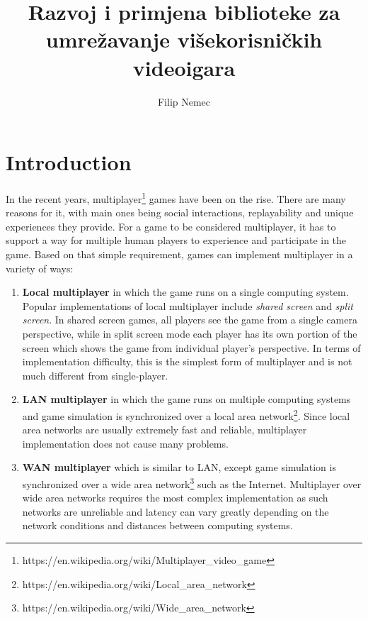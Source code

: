 \documentclass[times, utf8, diplomski]{fer}
\begin{document}
\title{Razvoj i primjena biblioteke za umrežavanje višekorisničkih videoigara}
\author{Filip Nemec}

\maketitleeng
\maketitle





{\footnotesize\tableofcontents}

\chapter{Introduction}
In the recent years, multiplayer\footnote{https://en.wikipedia.org/wiki/Multiplayer\_video\_game} games have been on the rise. There are many reasons for it, with main ones being social interactions, replayability and unique experiences they provide. For a game to be considered multiplayer, it has to support a way for multiple human players to experience and participate in the game. Based on that simple requirement, games can implement multiplayer in a variety of ways:

\begin{enumerate}
	\item \textbf{Local multiplayer} in which the game runs on a single computing system. Popular implementations of local multiplayer include \textit{shared screen} and \textit{split screen}. In shared screen games, all players see the game from a single camera perspective, while in split screen mode each player has its own portion of the screen which shows the game from individual player's perspective. In terms of implementation difficulty, this is the simplest form of multiplayer and is not much different from single-player.
	
	\item \textbf{LAN multiplayer} in which the game runs on multiple computing systems and game simulation is synchronized over a local area network\footnote{https://en.wikipedia.org/wiki/Local\_area\_network}. Since local area networks are usually extremely fast and reliable, multiplayer implementation does not cause many problems.
	
	\item \textbf{WAN multiplayer} which is similar to LAN, except game simulation is synchronized over a wide area network\footnote{https://en.wikipedia.org/wiki/Wide\_area\_network} such as the Internet. Multiplayer over wide area networks requires the most complex implementation as such networks are unreliable and latency can vary greatly depending on the network conditions and distances between computing systems.
\end{enumerate}
\end{document}
